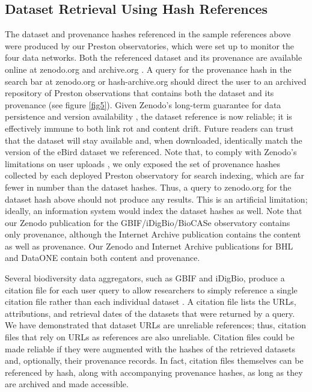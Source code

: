 \subsection*{Dataset Retrieval Using Hash References}
The dataset and provenance hashes referenced in the sample references above were produced by our Preston observatories, which were set up to monitor the four data networks. Both the referenced dataset and its provenance are available online at zenodo.org \citep{poelen_jorrit_h_2019_3483218, poelen_jorrit_h_2019_3484555, poelen_jorrit_h_2019_3484205} and archive.org \citep{poelen_jorrit_h_2019_archive_org}. A query for the provenance hash in the search bar at zenodo.org or hash-archive.org should direct the user to an archived repository of Preston observations that contains both the dataset and its provenance (see figure \ref{fig5}). Given Zenodo's long-term guarantee for data persistence and version availability \citep{zenodo_2019}, the dataset reference is now reliable; it is effectively immune to both link rot and content drift. Future readers can trust that the dataset will stay available and, when downloaded, identically match the version of the eBird dataset we referenced. Note that, to comply with Zenodo's limitations on user uploads \citep{zenodo_2019}, we only exposed the set of provenance hashes collected by each deployed Preston observatory for search indexing, which are far fewer in number than the dataset hashes. Thus, a query to zenodo.org for the dataset hash above should not produce any results. This is an artificial limitation; ideally, an information system would index the dataset hashes as well. Note that our Zenodo publication for the GBIF/iDigBio/BioCASe observatory \citep{poelen_jorrit_h_2019_3484205} contains only provenance, although the Internet Archive publication \citep{poelen_jorrit_h_2019_archive_org} contains the content as well as provenance. Our Zenodo and Internet Archive publications for BHL \citep{poelen_jorrit_h_2019_3484555, poelen_jorrit_h_2019_archive_org_bhl} and DataONE \citep{poelen_jorrit_h_2019_3483218,poelen_jorrit_h_2019_archive_org_dataone} contain both content and provenance.

Several biodiversity data aggregators, such as GBIF and iDigBio, produce a citation file for each user query to allow researchers to simply reference a single citation file rather than each individual dataset . A citation file lists the URLs, attributions, and retrieval dates of the datasets that were returned by a query. We have demonstrated that dataset URLs are unreliable references; thus, citation files that rely on URLs as references are also unreliable. Citation files could be made reliable if they were augmented with the hashes of the retrieved datasets and, optionally, their provenance records. In fact, citation files themselves can be referenced by hash, along with accompanying provenance hashes, as long as they are archived and made accessible.

